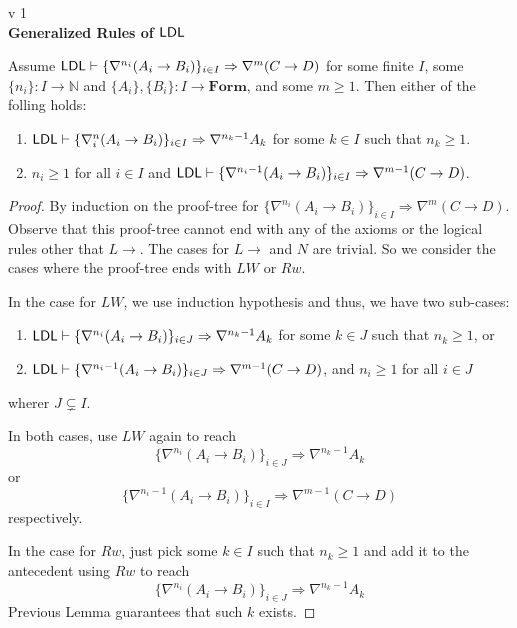 \documentclass[a4paper, 12pt]{paper}
\begin{document}
{\noindent
  v 1 \\
{\large\textbf{Generalized Rules of $\mathsf{LDL}$}}
}
\\

\begin{thm}
  Assume $\mathsf{LDL} \vdash \{ \nabla^{n_i} (A_i \to B_i) \}_{i \in I} \Rightarrow \nabla^m (C \to D)$ for some finite $I$, some $\{ n_i \} : I \to \mathbb{N}$ and $\{ A_i \}, \{ B_i \} : I \to \textbf{Form}$, and some $m \ge 1$. Then either of the folling holds:
  \begin{enumerate}
    \item $\mathsf{LDL} \vdash \{ \nabla^n_i (A_i \to B_i) \}_{i \in I} \Rightarrow \nabla^{n_k - 1} A_k$ for some $k \in I$ such that $n_k \ge 1$.
    \item $n_i \ge 1$ for all $i \in I$ and $\mathsf{LDL} \vdash \{ \nabla^{n_i - 1} (A_i \to B_i) \}_{i \in I} \Rightarrow \nabla^{m - 1} (C \to D)$.
  \end{enumerate}
\end{thm}
\begin{proof}


  By induction on the proof-tree for $\{ \nabla^{n_i} (A_i \to B_i) \}_{i \in I} \Rightarrow \nabla^m (C \to D)$. Observe that this proof-tree cannot end with any of the axioms or the logical rules other that $L \to$. The cases for $L \to$ and $N$ are trivial. So we consider the cases where the proof-tree ends with $LW$ or $Rw$. 

  In the case for $LW$, we use induction hypothesis and thus, we have two sub-cases:
  \begin{enumerate}
    \item $\mathsf{LDL} \vdash \{ \nabla^{n_i} (A_i \to B_i) \}_{i \in J} \Rightarrow \nabla^{n_k - 1} A_k$ for some $k \in J$ such that $n_k \ge 1$, or
    \item $\mathsf{LDL} \vdash \{ \nabla^{n_i - 1} (A_i \to B_i) \}_{i \in J} \Rightarrow \nabla^{m - 1} (C \to D)$, and $n_i \ge 1$ for all $i \in J$
  \end{enumerate}
  wherer $J \subsetneq I$.
  
  In both cases, use $LW$ again to reach $$\{ \nabla^{n_i} (A_i \to B_i) \}_{i \in J} \Rightarrow \nabla^{n_k - 1} A_k$$ or $$\{ \nabla^{n_i - 1} (A_i \to B_i) \}_{i \in I} \Rightarrow \nabla^{m - 1} (C \to D)$$ respectively.

  In the case for $Rw$, just pick some $k \in I$ such that $n_{k} \ge 1$ and add it to the antecedent using $Rw$ to reach $$ \{ \nabla^{n_i} (A_i \to B_i) \}_{i \in J} \Rightarrow \nabla^{n_k - 1} A_k $$
  Previous Lemma guarantees that such $k$ exists.
\end{proof}
\end{document}
